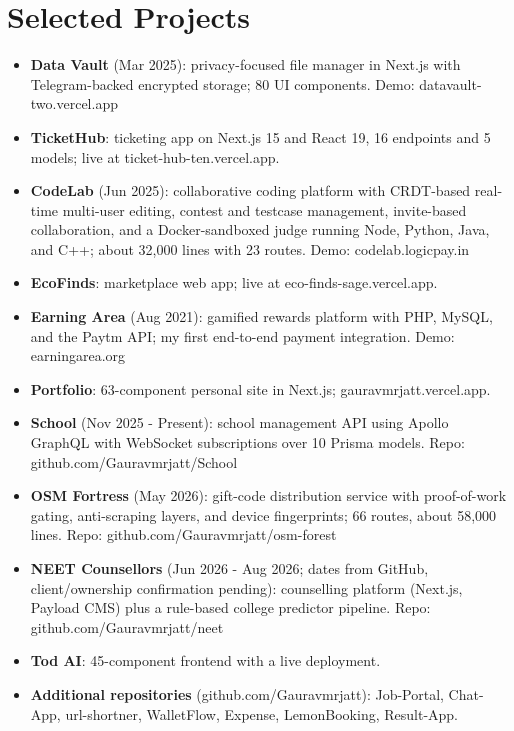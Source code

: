 \documentclass[11pt,a4paper,sans]{moderncv}
\begin{document}
\section{Selected Projects}
\vspace{1pt}
\begin{itemize}
    \item {\textbf{Data Vault} (Mar 2025): privacy-focused file manager in Next.js with Telegram-backed encrypted storage; 80 UI components. Demo: datavault-two.vercel.app}
    \item {\textbf{TicketHub}: ticketing app on Next.js 15 and React 19, 16 endpoints and 5 models; live at ticket-hub-ten.vercel.app.}
    \item {\textbf{CodeLab} (Jun 2025): collaborative coding platform with CRDT-based real-time multi-user editing, contest and testcase management, invite-based collaboration, and a Docker-sandboxed judge running Node, Python, Java, and C++; about 32,000 lines with 23 routes. Demo: codelab.logicpay.in}
    \item {\textbf{EcoFinds}: marketplace web app; live at eco-finds-sage.vercel.app.}
    \item {\textbf{Earning Area} (Aug 2021): gamified rewards platform with PHP, MySQL, and the Paytm API; my first end-to-end payment integration. Demo: earningarea.org}
    \item {\textbf{Portfolio}: 63-component personal site in Next.js; gauravmrjatt.vercel.app.}
    \item {\textbf{School} (Nov 2025 - Present): school management API using Apollo GraphQL with WebSocket subscriptions over 10 Prisma models. Repo: github.com/Gauravmrjatt/School}
    \item {\textbf{OSM Fortress} (May 2026): gift-code distribution service with proof-of-work gating, anti-scraping layers, and device fingerprints; 66 routes, about 58,000 lines. Repo: github.com/Gauravmrjatt/osm-forest}
    \item {\textbf{NEET Counsellors} (Jun 2026 - Aug 2026; dates from GitHub, client/ownership confirmation pending): counselling platform (Next.js, Payload CMS) plus a rule-based college predictor pipeline. Repo: github.com/Gauravmrjatt/neet}
    \item {\textbf{Tod AI}: 45-component frontend with a live deployment.}
    \item {\textbf{Additional repositories} (github.com/Gauravmrjatt): Job-Portal, Chat-App, url-shortner, WalletFlow, Expense, LemonBooking, Result-App.}
\end{itemize}
\end{document}
